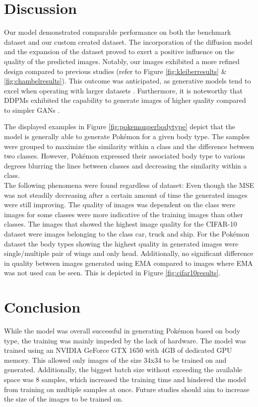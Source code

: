\documentclass[12pt]{article}
\theoremstyle{plain}
\theoremstyle{definition}
\theoremstyle{remark}
\begin{document}
\section{Discussion}
\label{sec:discussion}
Our model demonstrated comparable performance on both the benchmark dataset and our custom created dataset. The incorporation of the diffusion model and the expansion of the dataset proved to exert a positive influence on the quality of the predicted images. Notably, our images exhibited a more refined design compared to previous studies (refer to Figure \ref{fig:kleiberresults} \& \ref{fig:chambelresults}). This outcome was anticipated, as generative models tend to excel when operating with larger datasets \citep{Yang2023}. Furthermore, it is noteworthy that \ac{DDPM}s exhibited the capability to generate images of higher quality compared to simpler \ac{GAN}s \citep{Guarnera2023}.

The displayed examples in Figure \ref{fig:pokemonperbodytype} depict that the model is generally able to generate Pokémon for a given body type. The samples were grouped to maximize the similarity within a class and the difference between two classes. However, Pokémon expressed their associated body type to various degrees blurring the lines between classes and decreasing the similarity within a class. \\
The following phenomena were found regardless of dataset: Even though the \ac{MSE} was not steadily decreasing after a certain amount of time the generated images were still improving. The quality of images was dependent on the class were images for some classes were more indicative of the training images than other classes. The images that showed the highest image quality for the \ac{CIFAR-10} dataset were images belonging to the class car, truck and ship. For the Pokémon dataset the body types showing the highest quality in generated images were single/multiple pair of wings and only head. Additionally, no significant difference in quality between images generated using \ac{EMA} compared to images where \ac{EMA} was not used can be seen. This is depicted in Figure \ref{fig:cifar10results}.

\section{Conclusion}
\label{sec:conclusion}

While the model was overall successful in generating Pokémon based on body type, the training was mainly impeded by the lack of hardware. The model was trained using an NVIDIA GeForce GTX 1650 with 4GB of dedicated GPU memory. This allowed only images of the size 34x34 to be trained on and generated. Additionally, the biggest batch size without exceeding the available space was 8 samples, which increased the training time and hindered the model from training on multiple samples at once. Future studies should aim to increase the size of the images to be trained on.

%
%
\newpage
\printbibliography[heading=bibintoc]
\end{document}

